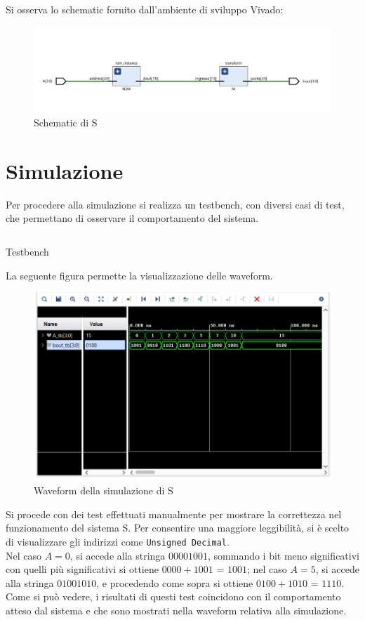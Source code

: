 Si osserva lo schematic fornito dall'ambiente di sviluppo Vivado:
\begin{figure}[H]
	\centering
	\includegraphics[width=1\textwidth]{img/ROM_plus_M}
	\caption{Schematic di S}
	\label{SchemS} 
\end{figure}

\section{Simulazione}
Per procedere alla simulazione si realizza un testbench, con diversi casi di test, che permettano di osservare il comportamento del sistema.
\begin{code}
    \inputminted[frame=lines, framesep=2mm, baselinestretch=1.2, bgcolor=LightGray, fontsize=\footnotesize, linenos]{vhdl}{vhdl_files/ROMplusM_tb.vhd}
    \caption{Testbench}
    \label{lst:S_TB}
\end{code}
La seguente figura  permette la visualizzazione delle waveform.
\begin{figure}[H]
	\centering
	\includegraphics[width=1\textwidth]{img/Sim_Rom_plus_M}
	\caption{Waveform della simulazione di S}
	\label{SchemS} 
\end{figure}
Si procede con dei test effettuati manualmente per mostrare la correttezza nel funzionamento del sistema S. Per consentire una maggiore leggibilità, si è scelto di visualizzare gli indirizzi come \texttt{Unsigned Decimal}.\\
Nel caso $A = 0$, si accede alla stringa $00001001$, sommando i bit meno significativi con quelli più significativi si ottiene $0000+1001$ = $1001$;
nel caso $A = 5$, si accede alla stringa $01001010$, e procedendo come sopra si ottiene $0100+1010$ = $1110$.\\
Come si può vedere, i risultati di questi test coincidono con il comportamento atteso dal sistema e che sono mostrati nella waveform relativa alla simulazione. 

